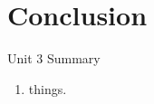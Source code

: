 \documentclass{beamer}
\begin{document}
\section{Conclusion}

\begin{frame}{Unit 3 Summary}
\begin{enumerate}
\item things.
\end{enumerate}
\end{frame}
\end{document}
